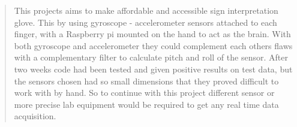 \begin{abstract}
This projects aims to make affordable and accessible sign interpretation glove. This by using gyroscope - accelerometer sensors attached to each finger, with a Raspberry pi mounted on the hand to act as the brain. With both gyroscope and accelerometer they could complement each others flaws with a complementary filter to calculate pitch and roll of the sensor. After two weeks code had been tested and given positive results on test data, but the sensors chosen had so small dimensions that they proved difficult to work with by hand. So to continue with this project different sensor or more precise lab equipment would be required to get any real time data acquisition.

\end{abstract}